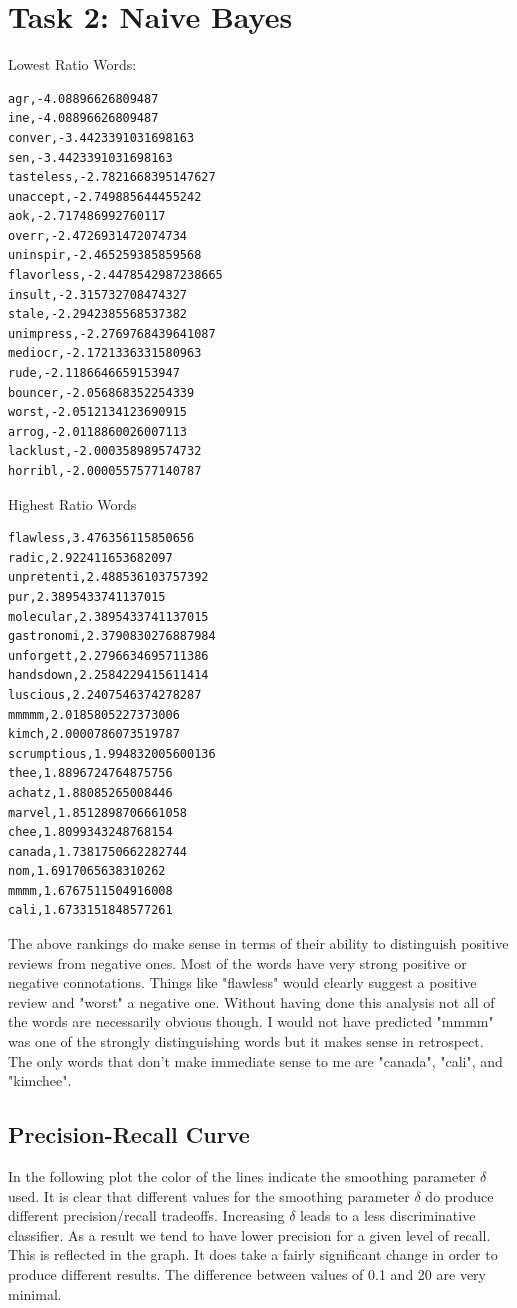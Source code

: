 \documentclass[paper=a4, fontsize=11pt]{jhwhw} %
\begin{document}
\section{Task 2: Naive Bayes}
Lowest Ratio Words:
\begin{verbatim}
agr,-4.08896626809487
ine,-4.08896626809487
conver,-3.4423391031698163
sen,-3.4423391031698163
tasteless,-2.7821668395147627
unaccept,-2.749885644455242
aok,-2.717486992760117
overr,-2.4726931472074734
uninspir,-2.465259385859568
flavorless,-2.4478542987238665
insult,-2.315732708474327
stale,-2.2942385568537382
unimpress,-2.2769768439641087
mediocr,-2.1721336331580963
rude,-2.1186646659153947
bouncer,-2.056868352254339
worst,-2.0512134123690915
arrog,-2.0118860026007113
lacklust,-2.000358989574732
horribl,-2.0000557577140787
\end{verbatim}

Highest Ratio Words
\begin{verbatim}
flawless,3.476356115850656
radic,2.922411653682097
unpretenti,2.488536103757392
pur,2.3895433741137015
molecular,2.3895433741137015
gastronomi,2.3790830276887984
unforgett,2.2796634695711386
handsdown,2.2584229415611414
luscious,2.2407546374278287
mmmmm,2.0185805227373006
kimch,2.0000786073519787
scrumptious,1.994832005600136
thee,1.8896724764875756
achatz,1.88085265008446
marvel,1.8512898706661058
chee,1.8099343248768154
canada,1.7381750662282744
nom,1.6917065638310262
mmmm,1.6767511504916008
cali,1.6733151848577261
\end{verbatim}

The above rankings do make sense in terms of their ability to distinguish positive reviews from negative ones. Most of the words have very strong positive or negative connotations. Things like "flawless" would clearly suggest a positive review and "worst" a negative one. Without having done this analysis not all of the words are necessarily obvious though. I would not have predicted "mmmm" was one of the strongly distinguishing words but it makes sense in retrospect. The only words that don't make immediate sense to me are "canada", "cali", and "kimchee".

\subsection{Precision-Recall Curve}
In the following plot the color of the lines indicate the smoothing parameter $\delta$ used.
It is clear that different values for the smoothing parameter $\delta$ do produce different precision/recall tradeoffs. Increasing $\delta$ leads to a less discriminative classifier. As a result we tend to have lower precision for a given level of recall. This is reflected in the graph. It does take a fairly significant change in order to produce different results. The difference between values of 0.1 and 20 are very minimal.
\end{document}
